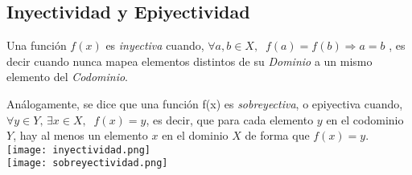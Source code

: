 \subsection{Inyectividad y Epiyectividad}
Una función $f(x)$ es \textit{inyectiva} cuando,
$\forall a,b \in X, \;\; f(a)=f(b) \Rightarrow a=b$
, es decir cuando nunca mapea elementos distintos de su \textit{Dominio} a un mismo elemento del \textit{Codominio}.

Análogamente, se dice que una función f(x) es \textit{sobreyectiva}, o epiyectiva cuando, $\forall y \in Y, \, \exists x \in X, \;\; f(x)=y$, es decir, que para cada elemento $y$ en el codominio $Y$, hay al menos un elemento $x$ en el dominio $X$ de forma que $f(x) = y$.\\
\texttt{[image: inyectividad.png]}\\
\texttt{[image: sobreyectividad.png]}